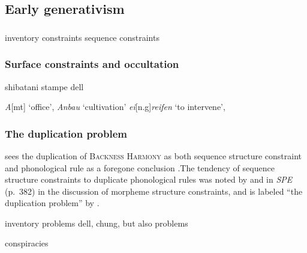 \subsection{Early generativism}


\subsubsection{\citealt{Stanley1967}}

inventory constraints
sequence constraints

\subsubsection{Surface constraints and occultation}

shibatani
stampe
dell

\emph{A}[mt] `office', \emph{Anbau} `cultivation'
\emph{ei}[n.g]\emph{reifen} `to intervene',

\subsubsection{The duplication problem}

\citeauthor{Anderson1974} sees the duplication of \textsc{Backness Harmony} as both sequence structure constraint and phonological rule as a foregone conclusion
.The tendency of sequence structure constraints to duplicate phonological rules was noted by \citet[][401f.]{Stanley1967} and in \emph{SPE} (p.~382) in the discussion of morpheme structure constraints, and is labeled ``the duplication problem'' by \citet[][?]{Kenstowicz1977}.

inventory problems 
dell, chung, but also problems

conspiracies
